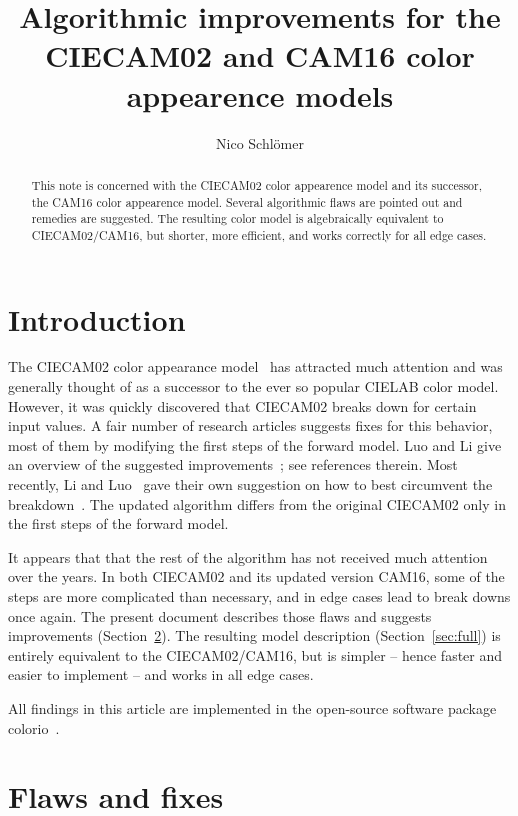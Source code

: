 \documentclass[twocolumn]{scrartcl}
\title{Algorithmic improvements for the CIECAM02 and CAM16 color appearence models}
\author{Nico Schlömer}
\theoremstyle{named}
\begin{document}
\maketitle
\begin{abstract}
  This note is concerned with the CIECAM02 color appearence model and its
  successor, the CAM16 color appearence model. Several algorithmic flaws are
  pointed out and remedies are suggested. The resulting color model is
  algebraically equivalent to CIECAM02/CAM16, but shorter, more efficient, and
  works correctly for all edge cases.
\end{abstract}

\section{Introduction}

The CIECAM02 color appearance model~\cite{ciecam02} has attracted much
attention and was generally thought of as a successor to the ever so popular
CIELAB color model. However, it was quickly discovered that CIECAM02 breaks
down for certain input values. A fair number of research articles suggests
fixes for this behavior, most of them by modifying the first steps of the
forward model. Luo and Li give an overview of the suggested
improvements~\cite{ciecam02-recent}; see references therein.  Most recently,
Li and Luo~\cite{cam16} gave their own suggestion on how to best
circumvent the breakdown~\cite{cam16}. The updated algorithm differs from the
original CIECAM02 only in the first steps of the forward model.

It appears that that the rest of the algorithm has not received much attention
over the years. In both CIECAM02 and its updated version CAM16, some of the
steps are more complicated than necessary, and in edge cases lead to break
downs once again. The present document describes those flaws and suggests
improvements (Section~\ref{sec:ff}). The resulting model description
(Section~\ref{sec:full}) is entirely equivalent to the CIECAM02/CAM16, but is
simpler -- hence faster and easier to implement -- and works in all edge
cases.

All findings in this article are implemented in the open-source software package
colorio~\cite{colorio}.


\section{Flaws and fixes}\label{sec:ff}
\end{document}

